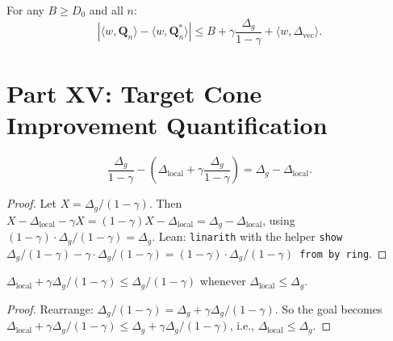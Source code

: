 \begin{theorem}
For any $B \ge D_0$ and all $n$:
\begin{equation}
    |\langle w, \mathbf{Q}_n \rangle - \langle w, \mathbf{Q}^*_n \rangle| \le B + \gamma \frac{\Delta_g}{1{-}\gamma} + \langle w, \Delta_{\mathrm{vec}} \rangle.
\end{equation}
\end{theorem}


\section{Part XV: Target Cone Improvement Quantification}
\label{app:improvement}

\begin{theorem}
\begin{equation}
    \frac{\Delta_g}{1{-}\gamma} - \left(\Delta_{\mathrm{local}} + \gamma \frac{\Delta_g}{1{-}\gamma}\right) = \Delta_g - \Delta_{\mathrm{local}}.
\end{equation}
\end{theorem}
\begin{proof}
Let $X = \Delta_g/(1{-}\gamma)$.  Then $X - \Delta_{\mathrm{local}} - \gamma X = (1{-}\gamma)X - \Delta_{\mathrm{local}} = \Delta_g - \Delta_{\mathrm{local}}$, using $(1{-}\gamma) \cdot \Delta_g/(1{-}\gamma) = \Delta_g$.  Lean: \texttt{linarith} with the helper \texttt{show $\Delta_g/(1{-}\gamma) - \gamma \cdot \Delta_g/(1{-}\gamma) = (1{-}\gamma) \cdot \Delta_g/(1{-}\gamma)$ from by ring}.
\end{proof}

\begin{corollary}
$\Delta_{\mathrm{local}} + \gamma\Delta_g/(1{-}\gamma) \le \Delta_g/(1{-}\gamma)$ whenever $\Delta_{\mathrm{local}} \le \Delta_g$.
\end{corollary}
\begin{proof}
Rearrange: $\Delta_g/(1{-}\gamma) = \Delta_g + \gamma\Delta_g/(1{-}\gamma)$.  So the goal becomes $\Delta_{\mathrm{local}} + \gamma\Delta_g/(1{-}\gamma) \le \Delta_g + \gamma\Delta_g/(1{-}\gamma)$, i.e., $\Delta_{\mathrm{local}} \le \Delta_g$.
\end{proof}

